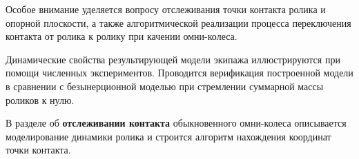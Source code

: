 Особое внимание уделяется вопросу
отслеживания точки контакта ролика и опорной плоскости,
а также алгоритмической реализации процесса 
переключения контакта от ролика к ролику при качении омни-колеса.

Динамические свойства результирующей модели экипажа иллюстрируются при помощи численных экспериментов.
Проводится верификация построенной модели в сравнении с безынерционной моделью при стремлении суммарной массы роликов к нулю.

В разделе об \textbf{отслеживании контакта} обыкновенного омни-колеса описывается моделирование динамики ролика и строится алгоритм нахождения координат точки контакта.

%
%

